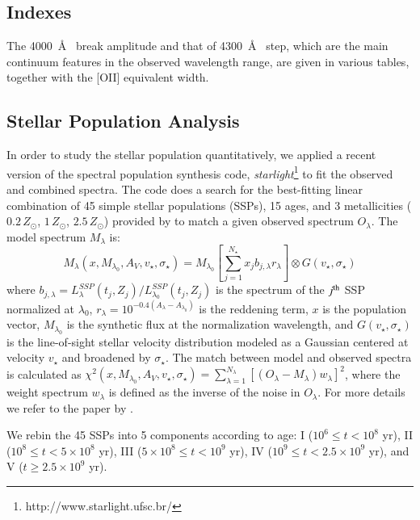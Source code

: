 \documentclass[referee]{aa}
\begin{document}
\subsection{Indexes}

The 4000~\AA ~ break amplitude and that of 4300~\AA ~ step, which are the main continuum features in the observed wavelength range, 
are given in various tables, together with the [OII] equivalent width.


\subsection{Stellar Population Analysis}
\label{popusynthesis}

In order to study the stellar population quantitatively, we applied a recent version of the spectral population synthesis code, {\it
starlight}\footnote{http://www.starlight.ufsc.br/} \citep{CidFernandes:2004p4742, Gu:2006p5026} to fit the observed and combined spectra. 
The code does a search for the best-fitting linear combination of 45 simple stellar populations
(SSPs), 15 ages, and 3 metallicities ($0.2\,Z_\odot$,
$1\,Z_\odot$, $2.5\,Z_\odot$) provided by \cite{Bruzual:2003p4498} to match
a given observed spectrum $O_\lambda$. The model spectrum
$M_\lambda$ is:
\begin{equation}
M_\lambda(x,M_{\lambda_0},A_V,v_\star,\sigma_\star) =
M_{\lambda_0}
   \left[
   \sum_{j=1}^{N_\star} x_j b_{j,\lambda} r_\lambda
   \right]
   \otimes G(v_\star,\sigma_\star)
\end{equation}
where $b_{j,\lambda} =L_\lambda^{SSP}(t_j,Z_j) / L_{\lambda_0}^{SSP}(t_j,Z_j)$ is the spectrum of the $j^{\rm th}$
SSP normalized at $\lambda_0$, $r_\lambda = 10^{-0.4(A_\lambda - A_{\lambda_0})}$ is the reddening term, $x$ is the
population vector, $M_{\lambda_0}$ is the synthetic flux at the normalization wavelength, and $G(v_\star,\sigma_\star)$ is the
line-of-sight stellar velocity distribution modeled as a Gaussian centered at velocity $v_\star$ and broadened by $\sigma_\star$.
The match between model and observed spectra is calculated as $
\chi^2(x,M_{\lambda_0},A_V,v_\star,\sigma_\star) =
   \sum_{\lambda=1}^{N_\lambda}
   \left[
   \left(O_\lambda - M_\lambda \right) w_\lambda
   \right]^2
$, where the weight spectrum $w_\lambda$ is defined as the inverse
of the noise in $O_\lambda$. For more details we refer to the paper by
\cite{CidFernandes:2005p4910}.

We rebin the 45 SSPs into 5 components according to age: I ($10^6 \leqslant t < 10^8$ yr), II
($10^8 \leqslant t < 5 \times 10^8$ yr), III ($5 \times10^8 \leqslant t < 10^9$ yr),
IV ($10^9 \leqslant t < 2.5 \times 10^{9}$ yr), and V ($t \geqslant 2.5 \times 10^{9}$ yr). 
\end{document}
